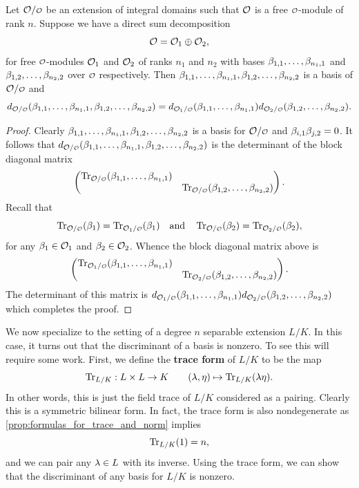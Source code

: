     \begin{proposition}\label{prop:discriminant_and_direct_sums}
      Let \(\mc{O}/\smc{O}\) be an extension of integral domains such that \(\mathcal{O}\) is a free \(\smc{O}\)-module of rank \(n\). Suppose we have a direct sum decomposition
      \[
        \mathcal{O} = \mathcal{O}_{1} \oplus \mathcal{O}_{2},
      \]
      for free \(\smc{O}\)-modules \(\mathcal{O}_{1}\) and \(\mathcal{O}_{2}\) of ranks \(n_{1}\) and \(n_{2}\) with bases \(\beta_{1,1},\ldots,\beta_{n_{1},1}\) and \(\beta_{1,2},\ldots,\beta_{n_{2},2}\) over \(\smc{O}\) respectively. Then \(\beta_{1,1},\ldots,\beta_{n_{1},1},\beta_{1,2},\ldots,\beta_{n_{2},2}\) is a basis of \(\mc{O}/\smc{O}\) and
      \[
        d_{\mc{O}/\smc{O}}(\b_{1,1},\ldots,\b_{n_{1},1},\b_{1,2},\ldots,\b_{n_{2},2}) = d_{\mc{O}_{1}/\smc{O}}(\b_{1,1},\ldots,\b_{n_{1},1})d_{\mc{O}_{2}/\smc{O}}(\b_{1,2},\ldots,\b_{n_{2},2}).
      \]
    \end{proposition}
    \begin{proof}
      Clearly \(\beta_{1,1},\ldots,\beta_{n_{1},1},\beta_{1,2},\ldots,\beta_{n_{2},2}\) is a basis for \(\mc{O}/\smc{O}\) and \(\beta_{i,1}\beta_{j,2} = 0\). It follows that \(d_{\mc{O}/\smc{O}}(\b_{1,1},\ldots,\b_{n_{1},1},\b_{1,2},\ldots,\b_{n_{2},2})\) is the determinant of the block diagonal matrix
      \[
        \begin{pmatrix} \Trace_{\mc{O}/\smc{O}}(\b_{1,1},\ldots,\b_{n_{1},1}) & \\ & \Trace_{\mc{O}/\smc{O}}(\b_{1,2},\ldots,\b_{n_{2},2}) \end{pmatrix}.
      \]
      Recall that
      \[
        \Trace_{\mc{O}/\smc{O}}(\b_{1}) = \Trace_{\mc{O}_{1}/\smc{O}}(\b_{1}) \quad \text{and} \quad \Trace_{\mc{O}/\smc{O}}(\b_{2}) = \Trace_{\mc{O}_{2}/\smc{O}}(\b_{2}),
      \]
      for any \(\beta_{1} \in \mathcal{O}_{1}\) and \(\beta_{2} \in \mathcal{O}_{2}\). Whence the block diagonal matrix above is
      \[
        \begin{pmatrix} \Trace_{\mc{O}_{1}/\smc{O}}(\b_{1,1},\ldots,\b_{n_{1},1}) & \\ & \Trace_{\mc{O}_{2}/\smc{O}}(\b_{1,2},\ldots,\b_{n_{2},2}) \end{pmatrix}.
      \]
      The determinant of this matrix is \(d_{\mc{O}_{1}/\smc{O}}(\b_{1,1},\ldots,\b_{n_{1},1})d_{\mc{O}_{2}/\smc{O}}(\b_{1,2},\ldots,\b_{n_{2},2})\) which completes the proof.
    \end{proof}
    
    We now specialize to the setting of a degree \(n\) separable extension \(L/K\). In this case, it turns out that the discriminant of a basis is nonzero. To see this will require some work. First, we define the \textbf{trace form} of \(L/K\) to be the map
    \[
      \operatorname{\mathrm{Tr}}_{L/K}:L \times L \to K \qquad (\lambda,\eta) \mapsto \operatorname{\mathrm{Tr}}_{L/K}(\lambda\eta).
    \]
    In other words, this is just the field trace of \(L/K\) considered as a pairing. Clearly this is a symmetric bilinear form. In fact, the trace form is also nondegenerate as \cref{prop:formulas_for_trace_and_norm} implies
    \[
      \operatorname{\mathrm{Tr}}_{L/K}(1) = n,
    \]
    and we can pair any \(\lambda \in L\) with its inverse. Using the trace form, we can show that the discriminant of any basis for \(L/K\) is nonzero.

